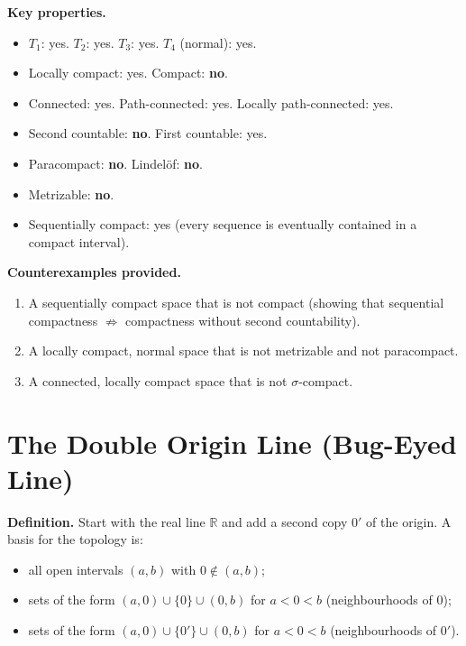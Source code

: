 \documentclass[11pt,a4paper,twoside]{book}
\theoremstyle{remark}
\theoremstyle{definition}
\theoremstyle{definition}
\begin{document}
\medskip
\textbf{Key properties.}
\begin{itemize}
  \item $T_1$: yes. \quad $T_2$: yes. \quad $T_3$: yes. \quad $T_4$ (normal): yes.
  \item Locally compact: yes. \quad Compact: \textbf{no}.
  \item Connected: yes. \quad Path-connected: yes. \quad Locally
        path-connected: yes.
  \item Second countable: \textbf{no}. \quad First countable: yes.
  \item Paracompact: \textbf{no}. \quad Lindel\"of: \textbf{no}.
  \item Metrizable: \textbf{no}.
  \item Sequentially compact: yes (every sequence is eventually
        contained in a compact interval).
\end{itemize}

\textbf{Counterexamples provided.}
\begin{enumerate}
  \item A sequentially compact space that is not compact (showing that
        sequential compactness $\not\Rightarrow$ compactness without
        second countability).
  \item A locally compact, normal space that is not metrizable and not
        paracompact.
  \item A connected, locally compact space that is not
        $\sigma$-compact.
\end{enumerate}

\section{The Double Origin Line (Bug-Eyed Line)}
\label{app:double-origin}

\textbf{Definition.}
Start with the real line $\mathbb{R}$ and add a second copy $0'$ of the
origin.  A basis for the topology is:
\begin{itemize}
  \item all open intervals $(a,b)$ with $0\notin(a,b)$;
  \item sets of the form $(a,0)\cup\{0\}\cup(0,b)$ for $a<0<b$
        (neighbourhoods of $0$);
  \item sets of the form $(a,0)\cup\{0'\}\cup(0,b)$ for $a<0<b$
        (neighbourhoods of $0'$).
\end{itemize}
\end{document}
